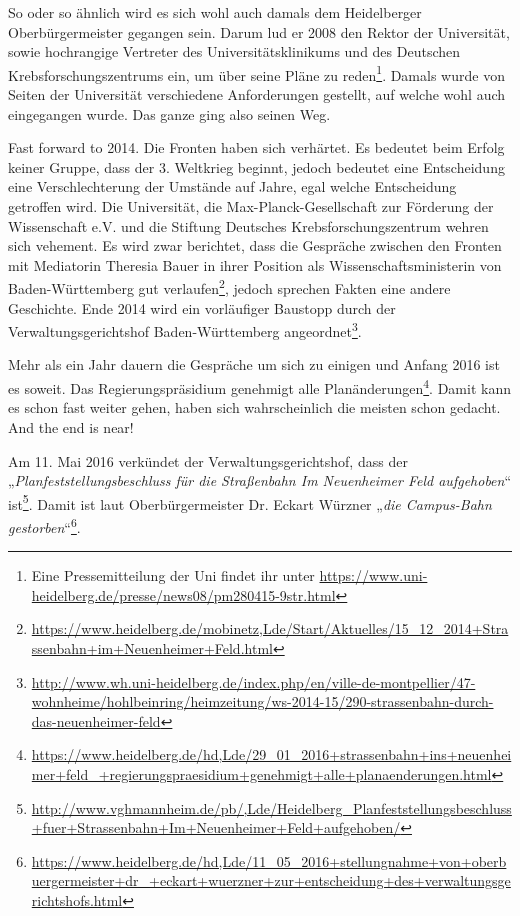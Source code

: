 So oder so ähnlich wird es sich wohl auch damals dem Heidelberger Oberbürgermeister gegangen sein. Darum lud er 2008 den Rektor der Universität, sowie hochrangige Vertreter des Universitätsklinikums und des Deutschen Krebsforschungszentrums ein, um über seine Pläne zu reden\footnote{Eine Pressemitteilung der Uni findet ihr unter \url{https://www.uni-heidelberg.de/presse/news08/pm280415-9str.html}}. Damals wurde von Seiten der Universität verschiedene Anforderungen gestellt, auf welche wohl auch eingegangen wurde. Das ganze ging also seinen Weg.

Fast forward to 2014. Die Fronten haben sich verhärtet. Es bedeutet beim Erfolg keiner Gruppe, dass der 3. Weltkrieg beginnt, jedoch bedeutet eine Entscheidung eine Verschlechterung der Umstände auf Jahre, egal welche Entscheidung getroffen wird. Die Universität, die Max-Planck-Gesellschaft zur Förderung der Wissenschaft e.V. und die Stiftung Deutsches Krebsforschungszentrum wehren sich vehement. Es wird zwar berichtet, dass die Gespräche zwischen den Fronten mit Mediatorin Theresia Bauer in ihrer Position als Wissenschaftsministerin von Baden-Württemberg gut verlaufen\footnote{\url{https://www.heidelberg.de/mobinetz,Lde/Start/Aktuelles/15_12_2014+Strassenbahn+im+Neuenheimer+Feld.html}}, jedoch sprechen Fakten eine andere Geschichte. Ende 2014 wird ein vorläufiger Baustopp durch der Verwaltungsgerichtshof Baden-Württemberg angeordnet\footnote{\url{http://www.wh.uni-heidelberg.de/index.php/en/ville-de-montpellier/47-wohnheime/hohlbeinring/heimzeitung/ws-2014-15/290-strassenbahn-durch-das-neuenheimer-feld}}.

Mehr als ein Jahr dauern die Gespräche um sich zu einigen und Anfang 2016 ist es soweit. Das Regierungspräsidium genehmigt alle Planänderungen\footnote{\url{https://www.heidelberg.de/hd,Lde/29_01_2016+strassenbahn+ins+neuenheimer+feld_+regierungspraesidium+genehmigt+alle+planaenderungen.html}}. Damit kann es schon fast weiter gehen, haben sich wahrscheinlich die meisten schon gedacht. And the end is near!

Am 11. Mai 2016 verkündet der Verwaltungsgerichtshof, dass der „\textit{Planfeststellungsbeschluss für die Straßenbahn Im Neuenheimer Feld aufgehoben}“ ist\footnote{\url{http://www.vghmannheim.de/pb/,Lde/Heidelberg_Planfeststellungsbeschluss+fuer+Strassenbahn+Im+Neuenheimer+Feld+aufgehoben/}}. Damit ist laut Oberbürgermeister Dr. Eckart Würzner „\textit{die Campus-Bahn gestorben}“\footnote{\url{https://www.heidelberg.de/hd,Lde/11_05_2016+stellungnahme+von+oberbuergermeister+dr_+eckart+wuerzner+zur+entscheidung+des+verwaltungsgerichtshofs.html}}.
